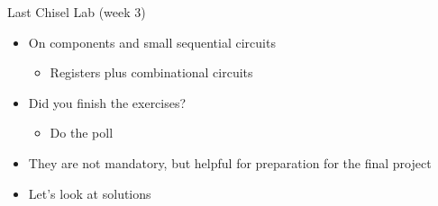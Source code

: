 
\begin{frame}[fragile]{Last Chisel Lab (week 3)}
\begin{itemize}
\item On components and small sequential circuits
\begin{itemize}
\item Registers plus combinational circuits
\end{itemize}
\item Did you finish the exercises?
\begin{itemize}
\item Do the poll
\end{itemize}
\item They are not mandatory, but helpful for preparation for the final project
\item Let's look at solutions
\end{itemize}
\end{frame}

